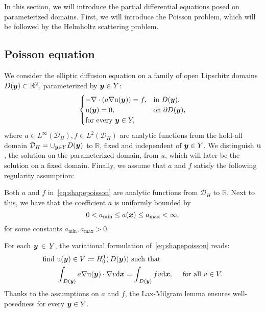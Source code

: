 In this section, we will introduce the partial differential equations posed on parameterized domains.
First, we will introduce the Poisson problem, which will be followed by the Helmholtz scattering problem.

\subsection{Poisson equation}\label{subsec:poisson-shape}
We consider the elliptic diffusion equation on a family of open Lipschitz domains ${D}({\bm{y}})\subset \mathbb{R}^2$, parameterized by ${\bm{y}}\in Y$:
\begin{equation}
    \begin{cases}
        -\nabla\cdot \left(a\nabla \mathrm{u}({\bm{y}}) \right) = f, & \text{in } {D}({\bm{y}}),\\
        \mathrm{u}({\bm{y}}) = 0, & \text{on } \partial {D}({\bm{y}}),\\
        \text{for every  }\bm{y} \in Y,
    \end{cases} \label{eq:shapepoisson}
\end{equation}
where $a\in L^\infty(\mathcal{D}_H), f\in L^2(\mathcal{D}_H)$ are analytic functions from the hold-all domain $\mathcal{D}_H = \cup_{{\bm{y}}\in Y}{D}({\bm{y}})$ to $\mathbb{R}$, fixed and independent of ${\bm{y}}\in Y$.
We distinguish $\mathrm{u}$, the solution on the parameterized domain, from $u$, which will later be the solution on a fixed domain.
Finally, we assume that $a$ and $f$ satisfy the following regularity assumption:
\begin{assumption}\label{ass:analytic}
Both $a$ and $f$ in~\eqref{eq:shapepoisson} are analytic functions from $\mathcal{D}_H$ to $\mathbb{R}$.
Next to this, we have that the coefficient $a$ is uniformly bounded by
\begin{equation*}
    0 < a_{\min} \leq a({{\bm{x}}}) \leq a_{\max} < \infty,
\end{equation*}
for some constants $a_{\min},a_{\max}>0$.
\end{assumption}
For each ${\bm{y}} \, \in \, Y$, the variational formulation of~\eqref{eq:shapepoisson} reads:
\begin{align}
    &\text{find }\mathrm{u}({\bm{y}}) \in V\coloneqq H_0^1(\mathop{}{D}({\bm{y}}))  \text{ such that}\nonumber \\
    &\qquad\int_{\mathop{}{D}({\bm{y}})} a \nabla \mathrm{u}({\bm{y}}) \cdot \nabla v \mathrm{d} \bm{x} = \int_{\mathop{}{D}({\bm{y}})} f v\mathrm{d} \bm{x}, \quad \text{ for all } {v} \in V. \label{eq:variational_formulation_y_poission}
\end{align}
Thanks to the assumptions on $a$ and $f$, the Lax-Milgram lemma ensures well-posedness for every ${\bm{y}} \in Y$.


